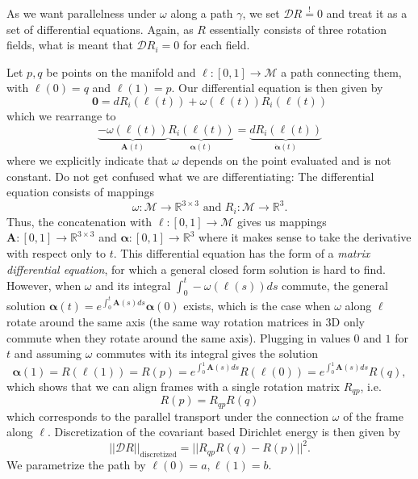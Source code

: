 \documentclass[../thesis.tex]{subfiles}
\begin{document}
As we want parallelness under $\omega$ along a path $\gamma$, we set $\mathcal{D}R \overset{!}{=}0$ and treat it as a set of
differential equations. Again, as $R$ essentially consists of 
three rotation fields, what is meant that $\mathcal{D}R_i =0$ for each field.

Let $p,q$ be points on the manifold and $\ell : [0,1]\to \mathcal{M}$ a path connecting them,
with $\ell(0)=q$ and $\ell(1)=p$.
Our differential equation is then given by
\begin{equation}
  \bm{0} = dR_i(\ell(t)) + \omega(\ell(t)) R_i(\ell(t))
\end{equation}
which we rearrange to
\begin{equation}
  \underbrace{-\omega (\ell(t))}_{\bm{A}(t)}  \underbrace{R_i(\ell(t))}_{\bm{\alpha}(t)} = \underbrace{dR_i(\ell(t))}_{\bm{\dot{\alpha}}(t)}
\end{equation}
where we explicitly indicate that $\omega$ depends on the point evaluated and is not constant.
Do not get confused what we are differentiating:
The differential equation consists of mappings 
$$\omega : \mathcal{M} \to \mathbb{R}^{3\times3} \text{ and }R_i : \mathcal{M}\to \mathbb{R}^3.$$
Thus, the concatenation with $\ell: [0,1] \to \mathcal{M}$ gives us mappings
$\bm{A}: [0,1] \to \mathbb{R}^{3\times 3}$ and $\bm{\alpha}:[0,1] \to \mathbb{R}^3$
where it makes sense to take the derivative with respect only to $t$.
This differential equation has the form of a \emph{matrix differential equation},
for which a general closed form solution is hard to find.
However, when $\omega$ and its integral $\int_0^t-\omega(\ell(s))ds$ commute, the general solution
$\bm{\alpha}(t)= e^{\int_0^t \bm{A}(s)ds}\bm{\alpha}(0)$ exists,
which is the case when $\omega$ along $\ell$ rotate around the same axis
(the same way rotation matrices in 3D only commute when they rotate around the same axis).
Plugging in values $0$ and $1$ for $t$ and assuming $\omega$ commutes with its integral gives the solution
$$\bm{\alpha}(1) = R(\ell(1)) = R(p) = e^{\int_0^1\bm{A}(s)ds}R(\ell(0))= e^{\int_0^1\bm{A}(s)ds}R(q),$$
which shows that we can 
align frames with a single rotation matrix $R_{qp}$, i.e.
$$R(p)= R_{qp}R(q)$$
which corresponds to the parallel transport under the connection $\omega$
of the frame along $\ell$.
Discretization of the covariant based Dirichlet energy is then given by
\begin{equation}\label{eq:dirichlet}
  ||\mathcal{D}R||_{\mathrm{discretized}}=||R_{qp}R(q)-R(p)||^2.
\end{equation}
We parametrize the path by $\ell(0)=a, \ell(1)=b$.
\end{document}
